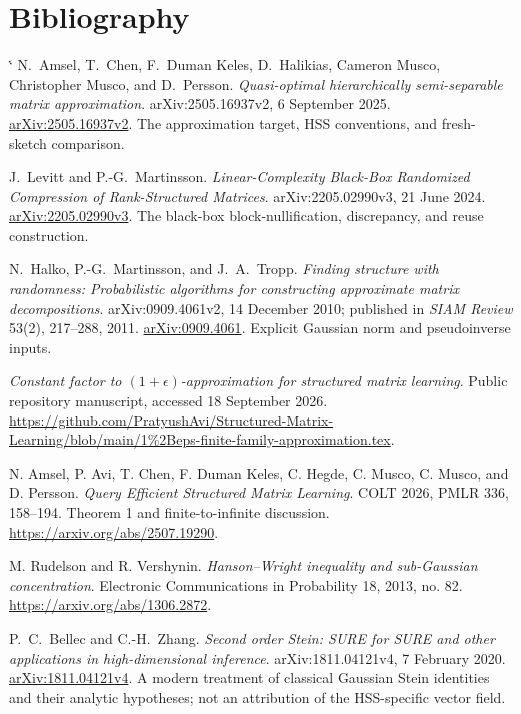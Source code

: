\documentclass[11pt,oneside,openany,a4paper]{book}
\makeatletter
\numberwithin{equation}{chapter}
\theoremstyle{definition}
\theoremstyle{remark}
\renewenvironment{thebibliography}[1]
 {\list{\@biblabel{\@arabic\c@enumiv}}%
 {\settowidth\labelwidth{\@biblabel{#1}}\leftmargin\labelwidth
 \advance\leftmargin\labelsep\@openbib@code\usecounter{enumiv}
 \let\p@enumiv\@empty\renewcommand\theenumiv{\@arabic\c@enumiv}}%
 \sloppy\clubpenalty4000\widowpenalty4000\sfcode`\.\@m}
 {\def\@noitemerr{\@latex@warning{Empty bibliography}}\endlist}
\makeatother
\begin{document}
\chapter*{Bibliography}
\begingroup\small
\renewcommand{\bibname}{}
\begin{thebibliography}{99}
N.~Amsel, T.~Chen, F.~Duman Keles, D.~Halikias, Cameron Musco,
Christopher Musco, and D.~Persson.
\emph{Quasi-optimal hierarchically semi-separable matrix approximation}.
arXiv:2505.16937v2, 6 September 2025.
\href{https://arxiv.org/abs/2505.16937v2}{arXiv:2505.16937v2}.
The approximation target, HSS conventions, and fresh-sketch comparison.

J.~Levitt and P.-G.~Martinsson.
\emph{Linear-Complexity Black-Box Randomized Compression of Rank-Structured
Matrices}.
arXiv:2205.02990v3, 21 June 2024.
\href{https://arxiv.org/abs/2205.02990v3}{arXiv:2205.02990v3}.
The black-box block-nullification, discrepancy, and reuse construction.

N.~Halko, P.-G.~Martinsson, and J.~A.~Tropp.
\emph{Finding structure with randomness: Probabilistic algorithms for
constructing approximate matrix decompositions}.
arXiv:0909.4061v2, 14 December 2010; published in \emph{SIAM Review}
53(2), 217--288, 2011.
\href{https://arxiv.org/abs/0909.4061}{arXiv:0909.4061}.
Explicit Gaussian norm and pseudoinverse inputs.

\emph{Constant factor to $(1+\epsilon)$-approximation for structured matrix learning}.
Public repository manuscript, accessed 18 September 2026.
\url{https://github.com/PratyushAvi/Structured-Matrix-Learning/blob/main/1%2Beps-finite-family-approximation.tex}.

N. Amsel, P. Avi, T. Chen, F. Duman Keles, C. Hegde, C. Musco, C. Musco, and D. Persson.
\emph{Query Efficient Structured Matrix Learning}.
COLT 2026, PMLR 336, 158--194. Theorem 1 and finite-to-infinite discussion.
\url{https://arxiv.org/abs/2507.19290}.

M. Rudelson and R. Vershynin.
\emph{Hanson--Wright inequality and sub-Gaussian concentration}.
Electronic Communications in Probability 18, 2013, no. 82.
\url{https://arxiv.org/abs/1306.2872}.

P.~C.~Bellec and C.-H.~Zhang.
\emph{Second order Stein: SURE for SURE and other applications in
high-dimensional inference}.
arXiv:1811.04121v4, 7 February 2020.
\href{https://arxiv.org/abs/1811.04121v4}{arXiv:1811.04121v4}.
A modern treatment of classical Gaussian Stein identities and their analytic
hypotheses; not an attribution of the HSS-specific vector field.


\end{thebibliography}
\end{document}
